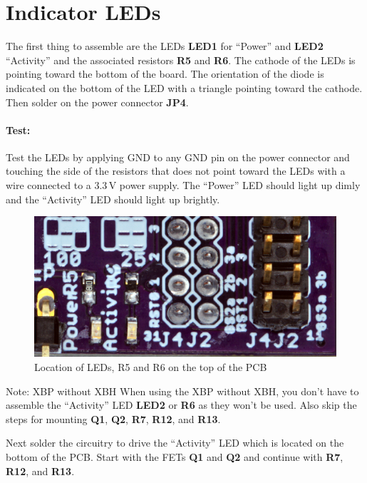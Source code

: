 \documentclass[twoside,11pt]{cergdoc}
\begin{document}
\section{Indicator LEDs}
The first thing to assemble are the LEDs \textbf{LED1} for ``Power'' and 
\textbf{LED2} ``Activity'' and the associated resistors \textbf{R5} and
\textbf{R6}. The cathode of the LEDs is pointing toward the bottom of the
board. The orientation of the diode is indicated on the bottom of the LED 
with a triangle pointing toward the cathode. 
Then solder on the power connector \textbf{JP4}.

\paragraph{Test:} Test the
LEDs by applying GND to any GND pin on the power connector and touching the side 
of the resistors that does not point toward the LEDs with a wire connected to a 
3.3\,V power supply. The
``Power'' LED should light up dimly and the ``Activity'' LED should light up brightly.

\begin{figure}[ht]
  \begin{center}
    \includegraphics[scale=0.8]{figures/xbp-leds}
    \caption{Location of LEDs, R5 and R6 on the top of the PCB}
  \end{center}
\end{figure}

\begin{cergbox}{Note: XBP without XBH}
    When using the XBP without XBH, you don't have to assemble the 
    ``Activity'' LED \textbf{LED2} or \textbf{R6} as they won't be used.
    Also skip the steps for mounting \textbf{Q1}, \textbf{Q2}, \textbf{R7},
    \textbf{R12}, and \textbf{R13}.
\end{cergbox}

\noindent Next solder the circuitry to drive the ``Activity'' LED which is located
on the bottom of the PCB. Start with the FETs \textbf{Q1} and \textbf{Q2}
and continue with \textbf{R7}, \textbf{R12}, and \textbf{R13}.
\end{document}
